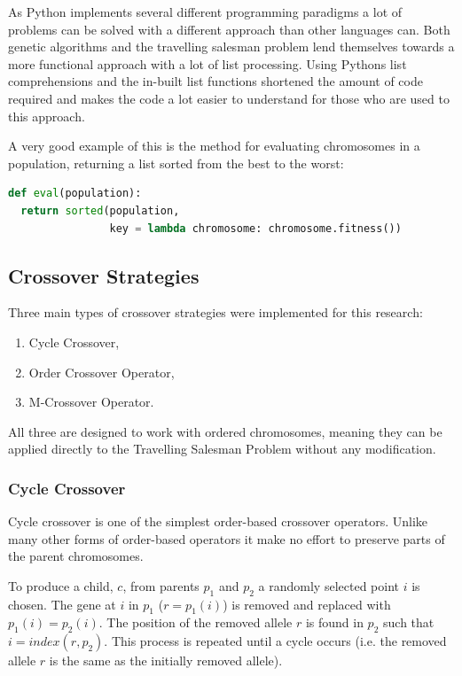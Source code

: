 \documentclass[10pt, a4paper]{article}
\begin{document}
As Python implements several different programming paradigms a lot of problems
can be solved with a different approach than other languages can. Both genetic
algorithms and the travelling salesman problem lend themselves towards a more
functional approach with a lot of list processing. Using Pythons list
comprehensions and the in-built list functions shortened the amount of code 
required and makes the code a lot easier to understand for those who are used 
to this approach.

A very good example of this is the method for evaluating chromosomes in a
population, returning a list sorted from the best to the worst:

\begin{lstlisting}[language=Python, 
                   caption=Using function elements to improve sustinctness and
                           readability]
def eval(population):
  return sorted(population, 
                key = lambda chromosome: chromosome.fitness())
\end{lstlisting}


\subsection{Crossover Strategies}

Three main types of crossover strategies were implemented for this research:

\begin{enumerate}
\item Cycle Crossover,
\item Order Crossover Operator,
\item M-Crossover Operator.%
\end{enumerate}

All three are designed to work with ordered chromosomes, meaning they can be
applied directly to the Travelling Salesman Problem without any modification.

\subsubsection{Cycle Crossover}

Cycle crossover is one of the simplest order-based crossover operators. Unlike
many other forms of order-based operators it make no effort to preserve parts 
of the parent chromosomes.

To produce a child, $c$, from parents $p_1$ and $p_2$ a randomly selected point
$i$ is chosen. The gene at $i$ in $p_1$ ($r = p_1(i)$) is removed and replaced 
with $p_1(i) = p_2(i)$. The position of the removed allele $r$ is found in 
$p_2$ such that $i = index(r, p_2)$. This process is repeated until a cycle
occurs (i.e. the removed allele $r$ is the same as the initially removed 
allele).
\end{document}
